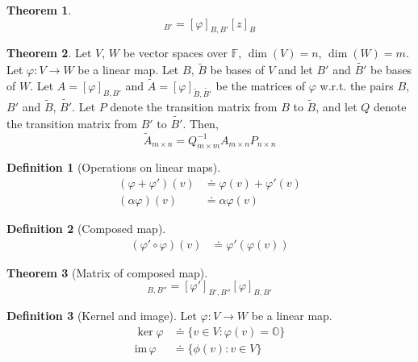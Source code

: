\documentclass[fleqn, a5paper, 10pt]{amsart}
\theoremstyle{definition}
\newtheorem{definition}{Definition} %
\theoremstyle{theorem}
\newtheorem{theorem}{Theorem} %
\theoremstyle{remark}
\newcommand{\im}{\mathrm{im}\,}
\numberwithin{corollary}{theorem}
\numberwithin{equation}{theorem}
\begin{document}
\begin{theorem}
	\begin{equation*}
		[\varphi(z)]_{B'} = [\varphi]_{B, B'} [z]_B
	\end{equation*}
\end{theorem}

\begin{theorem}
	Let $V$, $W$ be vector spaces over $\mathbb{F}$, $\dim (V) = n$, $\dim (W) = m$. Let $\varphi : V \to W$ be a linear map. Let $B$, $\widetilde{B}$ be bases of $V$ and let $B'$ and $\widetilde{B'}$ be bases of $W$. Let $A = [\varphi]_{B, B'}$ and $\widetilde{A} = [\varphi]_{\widetilde{B}, \widetilde{B'}}$ be the matrices of $\varphi$ w.r.t. the pairs $B$, $B'$ and $\widetilde{B}$, $\widetilde{B'}$. Let $P$ denote the transition matrix from $B$ to $\widetilde{B}$, and let $Q$ denote the transition matrix from $B'$ to $\widetilde{B'}$. Then,
	\begin{equation*}
		\widetilde{A}_{m \times n} = Q^{-1}_{m \times m} A_{m \times n} P_{n \times n}
	\end{equation*}
\end{theorem}

\begin{definition}[Operations on linear maps]
	\begin{align*}
		(\varphi + \varphi')(v) &\doteq \varphi(v) + \varphi'(v)\\
		(\alpha \varphi)(v) &\doteq \alpha \varphi(v)
	\end{align*}
\end{definition}

\begin{definition}[Composed map]
	\begin{align*}
		(\varphi' \circ \varphi)(v) &\doteq \varphi'(\varphi(v))
	\end{align*}
\end{definition}

\begin{theorem}[Matrix of composed map]
	\begin{equation*}
		[\varphi' \circ \varphi]_{B, B''} = [\varphi']_{B', B''} [\varphi]_{B, B'}
	\end{equation*}
\end{theorem}

\begin{definition}[Kernel and image]
	Let $\varphi : V \to W$ be a linear map.
	\begin{align*}
		\ker \varphi &\doteq \{v \in V : \varphi (v) = \mathbb{O}\}\\
		\im \varphi &\doteq \{\phi (v) : v \in V\}
	\end{align*}
\end{definition}
\end{document}
